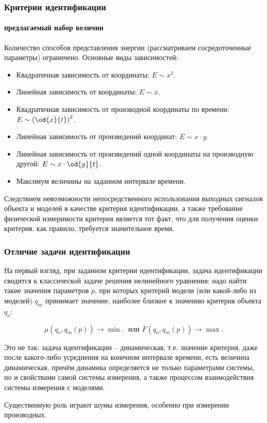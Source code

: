 \documentclass[10pt,utf8]{beamer}
\begin{document}
\begin{frame}
  \frametitle{Критерии идентификации}
  \framesubtitle{предлагаемый набор величин}

Количество способов
представления энергии (рассматриваем сосредоточенные параметры)
ограничено. Основные виды зависимостей:

\begin{itemize}

  \item
    Квадратичная зависимость от координаты: $E \sim x^2$.

  \item
    Линейная зависимость от координаты: $E \sim x$.

  \item
    Квадратичная зависимость от производной координаты по времени: $E \sim \left( \od{x}{t}\right)^2$.

  \item
    Линейная зависимость от произведений координат: $E \sim x \cdot y$.

  \item
    Линейная зависимость от произведений одной координаты на производную другой: $E \sim x \cdot \od{y}{t}$.

  \item
    Максимум величины на заданном интервале времени.

 \end{itemize}

  Следствием невозможности непосредственного использования выходных
  сигналов объекта и моделей в качестве критерия идентификации, а также
  требование физической измеримости критерия является
  тот факт, что для получения оценки критерия, как правило,
  требуется значительное время.

\end{frame}




\begin{frame}
  \frametitle{Отличие задачи идентификации}

  На первый взгляд, при заданном критерии идентификации, задача идентификации
  сводится к классической задаче решения нелинейного уравнения: надо найти такие значения
  параметров $p$, при которых критерий модели (или какой-либо из моделей)
  $q_m$ принимает значение, наиболее близкое к значению критерия объекта $q_o$:

  \[
    \mu( q_o, q_m(p) ) \to \min. \;
    \text{ или }
    \overline{F}( q_o, q_m(p) ) \to \max.
  \]

  Это не так:
  задача идентификации -- динамическая, т.е.
  значение критерия, даже после какого-либо усреднения на конечном
  интервале времени, есть величина динамическая, причём динамика определяется
  не только параметрами системы, но и свойствами самой системы измерения,
  а также процессом взаимодействия системы измерения с моделями.

  Существенную роль играют шумы измерения, особенно при измерении производных.
\end{frame}
\end{document}

